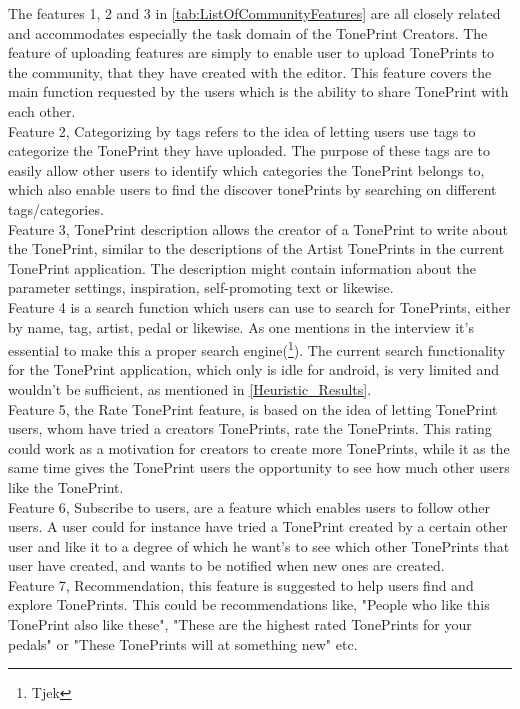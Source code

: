 The features 1, 2 and 3 in \autoref{tab:ListOfCommunityFeatures} are all closely related and accommodates especially the task domain of the TonePrint Creators. The feature of uploading features are simply to enable user to upload TonePrints to the community, that they have created with the editor. This feature covers the main function requested by the users which is the ability to share TonePrint with each other. \\
Feature 2, Categorizing by tags refers to the idea of letting users use tags to categorize the TonePrint they have uploaded. The purpose of these tags are to easily allow other users to identify which categories the TonePrint belongs to, which also enable users to find the discover tonePrints by searching on different tags/categories.\\
Feature 3, TonePrint description allows the creator of a TonePrint to write about the TonePrint, similar to the descriptions of the Artist TonePrints in the current TonePrint application. The description might contain information about the parameter settings, inspiration, self-promoting text or likewise. \\
Feature 4 is a search function which users can use to search for TonePrints, either by name, tag, artist, pedal or likewise. As one mentions in the interview it's essential to make this a proper search engine(\footnote{Tjek}). The current search functionality for the TonePrint application, which only is idle for android, is very limited and wouldn't be sufficient, as mentioned in \autoref{Heuristic_Results}. \\
Feature 5, the Rate TonePrint feature, is based on the idea of letting TonePrint users, whom have tried a creators TonePrints, rate the TonePrints. This rating could work as a motivation for creators to create more TonePrints, while it as the same time gives the TonePrint users the opportunity to see how much other users like the TonePrint. \\
Feature 6, Subscribe to users, are a feature which enables users to follow other users. A user could for instance have tried a TonePrint created by a certain other user and like it to a degree of which he want's to see which other TonePrints that user have created, and wants to be notified when new ones are created.\\
Feature 7, Recommendation, this feature is suggested to help users find and explore TonePrints. This could be recommendations like, "People who like this TonePrint also like these", "These are the highest rated TonePrints for your pedals" or "These TonePrints will at something new" etc.\\
